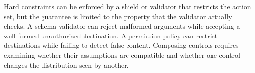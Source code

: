 Hard constraints can be enforced by a shield or validator that restricts the action set, but the guarantee is limited to the property that the validator actually checks. A schema validator can reject malformed arguments while accepting a well-formed unauthorized destination. A permission policy can restrict destinations while failing to detect false content. Composing controls requires examining whether their assumptions are compatible and whether one control changes the distribution seen by another.

